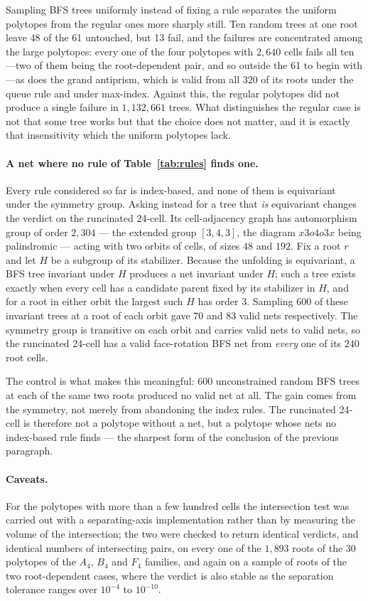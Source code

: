 \documentclass[11pt,letterpaper]{article}
\begin{document}
Sampling BFS trees uniformly instead of fixing a rule separates the
uniform polytopes from the regular ones more sharply still.
Ten random trees at one root leave 48 of the 61 untouched, but 13 fail,
and the failures are concentrated among the large polytopes: every one
of the four polytopes with $2{,}640$ cells fails all ten---two of them
being the root-dependent pair, and so outside the 61 to begin with---as
does the grand antiprism, which is valid from all $320$ of its roots
under the queue rule and under max-index.
Against this, the regular polytopes did not produce a single failure in
$1{,}132{,}661$ trees.
What distinguishes the regular case is not that some tree works but
that the choice does not matter, and it is exactly that insensitivity
which the uniform polytopes lack.

\paragraph{A net where no rule of Table~\ref{tab:rules} finds one.}
Every rule considered so far is index-based, and none of them is
equivariant under the symmetry group.
Asking instead for a tree that \emph{is} equivariant changes the
verdict on the runcinated 24-cell.
Its cell-adjacency graph has automorphism group of order $2{,}304$ ---
the extended group $[3,4,3]$, the diagram $x3o4o3x$ being palindromic
--- acting with two orbits of cells, of sizes $48$ and $192$.
Fix a root $r$ and let $H$ be a subgroup of its stabilizer.
Because the unfolding is equivariant, a BFS tree invariant under $H$
produces a net invariant under $H$; such a tree exists exactly when
every cell has a candidate parent fixed by its stabilizer in $H$, and
for a root in either orbit the largest such $H$ has order $3$.
Sampling $600$ of these invariant trees at a root of each orbit gave
$70$ and $83$ valid nets respectively.
The symmetry group is transitive on each orbit and carries valid nets
to valid nets, so the runcinated 24-cell has a valid face-rotation BFS
net from \emph{every} one of its $240$ root cells.

The control is what makes this meaningful: $600$ unconstrained random
BFS trees at each of the same two roots produced no valid net at all.
The gain comes from the symmetry, not merely from abandoning the index
rules.
The runcinated 24-cell is therefore not a polytope without a net, but
a polytope whose nets no index-based rule finds --- the sharpest form
of the conclusion of the previous paragraph.

\paragraph{Caveats.}
For the polytopes with more than a few hundred cells the intersection
test was carried out with a separating-axis implementation rather than
by measuring the volume of the intersection; the two were checked to
return identical verdicts, and identical numbers of intersecting
pairs, on every one of the $1{,}893$ roots of the 30 polytopes of the
$A_4$, $B_4$ and $F_4$ families, and again on a sample of roots of the
two root-dependent cases, where the verdict is also stable as the
separation tolerance ranges over $10^{-4}$ to $10^{-10}$.
\end{document}
